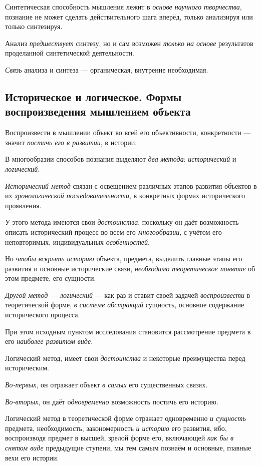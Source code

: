 \documentclass[a4paper,14pt,russian]{extreport}
\begin{document}
Синтетическая способность мышления лежит в \emph{основе научного творчества}, познание не может сделать действительного шага вперёд, только анализируя или только синтезируя.

Анализ \emph{предшествует} синтезу, но и сам возможен \emph{только на основе} результатов проделанной синтетической деятельности.

\emph{Связь} анализа и синтеза --- органическая, внутренне необходимая.

\subsection{Историческое и логическое. Формы воспроизведения мышлением объекта}

Воспроизвести в мышлении объект во всей его объективности, конкретности --- значит \emph{постичь его в развитии}, в истории.

В многообразии способов познания выделяют \emph{два метода}: \emph{исторический} и \emph{логический.}

\emph{Исторический метод} связан с освещением различных этапов развития объектов в их \emph{хронологической последовательности}, в конкретных формах исторического проявления.

У этого метода имеются свои \emph{достоинства}, поскольку он даёт возможность описать исторический процесс во всем его \emph{многообразии}, с учётом его неповторимых, индивидуальных \emph{особенностей}.

Но \emph{чтобы вскрыть историю} объекта, предмета, выделить главные этапы его развития и основные исторические связи, \emph{необходимо теоретическое понятие} об этом предмете, его сущности.

\emph{Другой метод --- логический} --- как раз и ставит своей задачей \emph{воспроизвести} в теоретической форме, \emph{в системе абстракций} сущность, основное содержание исторического процесса.

При этом исходным пунктом исследования становится рассмотрение предмета в его \emph{наиболее развитом виде}.

Логический метод, имеет свои \emph{достоинства} и некоторые преимущества перед историческим.

\emph{Во-первых}, он отражает объект \emph{в самых} его существенных связях.

\emph{Во-вторых}, он даёт о\emph{дновременно} возможность постичь его историю.

Логический метод в теоретической форме отражает одновременно \emph{и сущность} предмета, необходимость, закономерность \emph{и историю} его развития, ибо, воспроизводя предмет в высшей, зрелой форме его, включающей \emph{как бы в снятом виде} предыдущие ступени, мы тем самым познаём и основные, главные вехи его истории.
\end{document}
